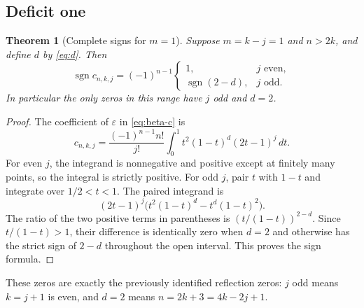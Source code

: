 \documentclass[11pt]{article}
\numberwithin{equation}{section}
\newtheorem{theorem}{Theorem}[section]
\theoremstyle{definition}
\theoremstyle{remark}
\DeclareMathOperator{\sgn}{sgn}
\begin{document}
\subsection{Deficit one}
\begin{theorem}[Complete signs for $m=1$]\label{thm:m1}
Suppose $m=k-j=1$ and $n>2k$, and define $d$ by \eqref{eq:d}. Then
\begin{equation}\label{eq:m1-sign}
 \sgn c_{n,k,j}=(-1)^{n-1}
 \begin{cases}
 1,&j\text{ even},\\
 \sgn(2-d),&j\text{ odd}.
 \end{cases}
\end{equation}
In particular the only zeros in this range have $j$ odd and $d=2$.
\end{theorem}
\begin{proof}
The coefficient of $\varepsilon$ in \eqref{eq:beta-c} is
\begin{equation}\label{eq:m1-integral}
 c_{n,k,j}=\frac{(-1)^{n-1}n!}{j!}
 \int_0^1t^2(1-t)^d(2t-1)^j\,dt.
\end{equation}
For even $j$, the integrand is nonnegative and positive except at finitely
many points, so the integral is strictly positive. For odd $j$, pair $t$
with $1-t$ and integrate over $1/2<t<1$. The paired integrand is
\[
 (2t-1)^j\bigl(t^2(1-t)^d-t^d(1-t)^2\bigr).
\]
The ratio of the two positive terms in parentheses is
$(t/(1-t))^{2-d}$. Since $t/(1-t)>1$, their difference is identically
zero when $d=2$ and otherwise has the strict sign of $2-d$ throughout
the open interval. This proves the sign formula.
\end{proof}
These zeros are exactly the previously identified reflection zeros:
$j$ odd means $k=j+1$ is even, and $d=2$ means
$n=2k+3=4k-2j+1$.
\end{document}
